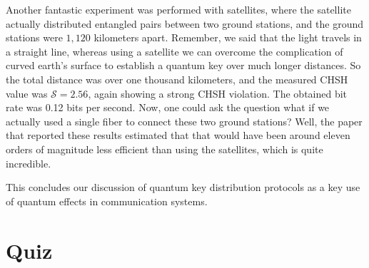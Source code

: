Another fantastic experiment was performed with satellites, where the satellite actually distributed entangled pairs between two ground stations, and the ground stations were $1,120$ kilometers apart. Remember, we said that the light travels in a straight line, whereas using a satellite we can overcome the complication of curved earth's surface to establish a quantum key over much longer distances. So the total distance was over one thousand kilometers, and the measured CHSH value was $\mathcal{S} = 2.56$, again showing a strong CHSH violation. The obtained bit rate was 0.12 bits per second. Now, one could ask the question what if we actually used a single fiber to connect these two ground stations? Well, the paper that reported these results estimated that that would have been around eleven orders of magnitude less efficient than using the satellites, which is quite incredible.

This concludes our discussion of quantum key distribution protocols as a key use of quantum effects in communication systems.

\newpage
\begin{exercises}



\end{exercises}

\newpage
\section*{Quiz}

